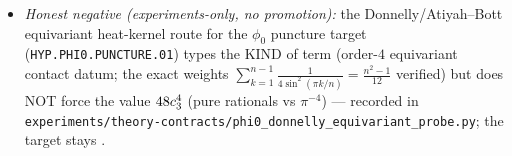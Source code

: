 \begin{itemize}[leftmargin=1.5em]
gate: the integer rung $M_R{=}\cthree^3\Mbar$ predicts $m_3{=}0.030$ eV --- $40\%$ low at $1$-loop
($\kappa$ run-down $0.794$) --- the ladder pin is DECLINED per \texttt{v354}/\texttt{v355}; the decision
computation is named ($2$-loop SM $+$ explicit PS thresholds). What survives: a \emph{one}-parameter,
window-bracketed \mO\ candidate with the falsifiable band $m_3\in[0.002,0.115]$ eV and the NO floor
$\Sigma m_\nu{=}0.059$ eV; frozen record untouched. Integrated in \texttt{tfpt\_2\_standard\_model} (new
paragraph after \texttt{v272}), \texttt{introduction} status card (third named candidate),
\texttt{tfpt\_5\_redteam}; ledger rows \texttt{FLAV.NUSCALE.02} $+$ \texttt{FLAV.NUSCALE.01} update note;
Python-only by nature.
\item \emph{Honest negative (experiments-only, no promotion):} the Donnelly/Atiyah--Bott equivariant
heat-kernel route for the $\phi_0$ puncture target (\texttt{HYP.PHI0.PUNCTURE.01}) types the KIND of term
(order-$4$ equivariant contact datum; the exact weights $\sum_{k=1}^{n-1}\tfrac1{4\sin^2(\pi k/n)}
{=}\tfrac{n^2-1}{12}$ verified) but does NOT force the value $48c_3^4$ (pure rationals vs $\pi^{-4}$)
--- recorded in \texttt{experiments/theory-contracts/phi0\_donnelly\_equivariant\_probe.py}; the target
stays \mO.
\end{itemize}

